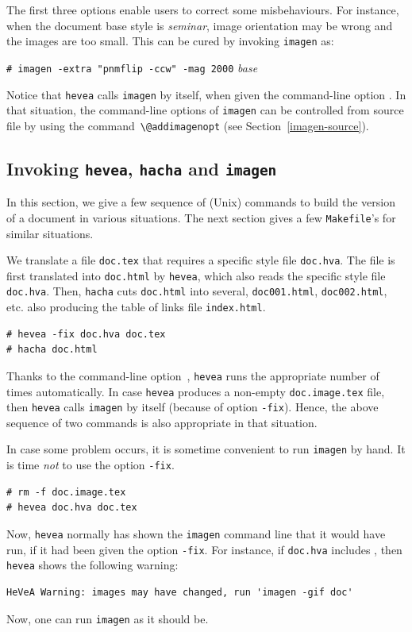 The first three options enable users to correct some misbehaviours.
For instance, when the document base style is \textit{seminar}, image
orientation may
be wrong and the images are too small. This can be cured by invoking
\texttt{imagen} as:
\begin{flushleft}
\texttt{\# imagen  -extra "pnmflip -ccw" -mag 2000} \textit{base}
\end{flushleft}

Notice that \texttt{hevea} calls \texttt{imagen} by itself,
when given the command-line option .
In that situation, the command-line options of \texttt{imagen} can
be controlled from source file by using the
command~\verb+\@addimagenopt+ (see Section~\ref{imagen-source}).

\subsection{Invoking \texttt{hevea}, \texttt{hacha} and \texttt{imagen}}
In this section, we give a few sequence of (Unix) commands to build
the \html{} version of a document in various
situations. The next section gives a few
\texttt{Makefile}'s for similar situations.

We translate a file \texttt{doc.tex}
that requires a specific style file \texttt{doc.hva}.
The file is first translated into \texttt{doc.html} by \texttt{hevea},
which also reads
the specific style file \texttt{doc.hva}.
Then, \texttt{hacha} cuts \texttt{doc.html} into several,
\texttt{doc001.html}, \texttt{doc002.html}, etc. also producing the
table of links file \texttt{index.html}.
\begin{verbatim}
# hevea -fix doc.hva doc.tex
# hacha doc.html
\end{verbatim}
Thanks to the command-line option~, \texttt{hevea} runs the
appropriate number of times automatically.
In case \texttt{hevea} produces a non-empty \texttt{doc.image.tex}
file, then \texttt{hevea} calls \texttt{imagen} by itself
(because of option \texttt{-fix}).
Hence, the above sequence of two commands is also appropriate in
that situation.

In case some problem occurs, it is sometime convenient to
run \texttt{imagen} by hand.
It is time \emph{not} to use the option \texttt{-fix}.
\begin{verbatim}
# rm -f doc.image.tex
# hevea doc.hva doc.tex
\end{verbatim}
Now, \texttt{hevea} normally has shown the \texttt{imagen}
command line that it would have run, if it had been given
the option \texttt{-fix}.
For instance, if \texttt{doc.hva} includes \verb++, then
\texttt{hevea} shows the following warning:
\begin{verbatim}
HeVeA Warning: images may have changed, run 'imagen -gif doc'
\end{verbatim}
Now, one can run \texttt{imagen} as it should be.

